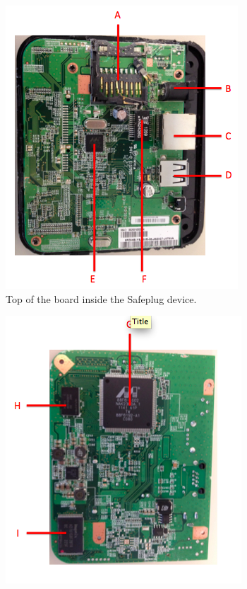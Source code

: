\begin{figure}[htb]
\centering
\begin{subfigure}[b]{.3\textwidth}
  \includegraphics[width=\textwidth]{safeplug_listed_top}
  \caption{Top of the board inside the Safeplug device.}
  \label{fig:top}
\end{subfigure}%
\qquad
\begin{subfigure}[b]{.3\textwidth}
\includegraphics[width=\textwidth]{safeplug_listed_bottom}

\end{subfigure}
\end{figure}
